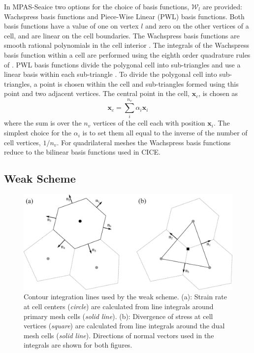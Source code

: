 In MPAS-Seaice two options for the choice of basis functions, $\mathcal{W}_l$ are provided: Wachspress basis functions and Piece-Wise Linear (PWL) basis functions. Both basis functions have a value of one on vertex $l$ and zero on the other vertices of a cell, and are linear on the cell boundaries. The Wachspress basis functions are smooth rational polynomials in the cell interior \citep{Dasgupta03}. The integrals of the Wachspress basis function within a cell are performed using the eighth order quadrature rules of \citet{Dunavant85}. PWL basis functions divide the polygonal cell into sub-triangles and use a linear basis within each sub-triangle \citep{Bailey08}. To divide the polygonal cell into sub-triangles, a point is chosen within the cell and sub-triangles formed using this point and two adjacent vertices. The central point in the cell, $\mathbf{x}_c$,  is chosen as
\begin{equation}
\mathbf{x}_c = \sum_i^{n_v} \alpha_i \mathbf{x}_i
\end{equation}
where the sum is over the $n_v$ vertices of the cell each with position $\mathbf{x}_i$. The simplest choice for the $\alpha_i$ is to set them all equal to the inverse of the number of cell vertices, $1/n_v$. For quadrilateral meshes the Wachspress basis functions reduce to the bilinear basis functions used in CICE.

\subsection{Weak Scheme}

\begin{figure}[]
\centering
\includegraphics[width=\linewidth]{seaice/figures/mesh_weak.eps}
\caption{Contour integration lines used by the weak scheme. (a): Strain rate at cell centers (\emph{circle}) are calculated from line integrals around primary mesh cells (\emph{solid line}). (b): Divergence of stress at cell vertices (\emph{square}) are calculated from line integrals around the dual mesh cells (\emph{solid line}). Directions of normal vectors used in the integrals are shown for both figures.}
\label{fig:mesh_weak}
\end{figure}

